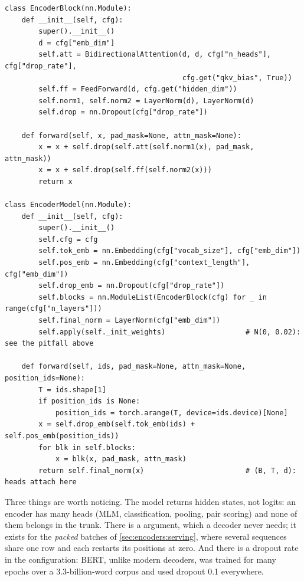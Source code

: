 \begin{lstlisting}[caption={Encoder block and model (from \ident{llmsys/encoder.py}).},label={lst:encoders:model}]
class EncoderBlock(nn.Module):
    def __init__(self, cfg):
        super().__init__()
        d = cfg["emb_dim"]
        self.att = BidirectionalAttention(d, d, cfg["n_heads"], cfg["drop_rate"],
                                          cfg.get("qkv_bias", True))
        self.ff = FeedForward(d, cfg.get("hidden_dim"))
        self.norm1, self.norm2 = LayerNorm(d), LayerNorm(d)
        self.drop = nn.Dropout(cfg["drop_rate"])

    def forward(self, x, pad_mask=None, attn_mask=None):
        x = x + self.drop(self.att(self.norm1(x), pad_mask, attn_mask))
        x = x + self.drop(self.ff(self.norm2(x)))
        return x

class EncoderModel(nn.Module):
    def __init__(self, cfg):
        super().__init__()
        self.cfg = cfg
        self.tok_emb = nn.Embedding(cfg["vocab_size"], cfg["emb_dim"])
        self.pos_emb = nn.Embedding(cfg["context_length"], cfg["emb_dim"])
        self.drop_emb = nn.Dropout(cfg["drop_rate"])
        self.blocks = nn.ModuleList(EncoderBlock(cfg) for _ in range(cfg["n_layers"]))
        self.final_norm = LayerNorm(cfg["emb_dim"])
        self.apply(self._init_weights)                   # N(0, 0.02): see the pitfall above

    def forward(self, ids, pad_mask=None, attn_mask=None, position_ids=None):
        T = ids.shape[1]
        if position_ids is None:
            position_ids = torch.arange(T, device=ids.device)[None]
        x = self.drop_emb(self.tok_emb(ids) + self.pos_emb(position_ids))
        for blk in self.blocks:
            x = blk(x, pad_mask, attn_mask)
        return self.final_norm(x)                        # (B, T, d): heads attach here
\end{lstlisting}

Three things are worth noticing. The model returns hidden states, not logits: an encoder has many
heads (MLM, classification, pooling, pair scoring) and none of them belongs in the trunk. There is a
 argument, which a decoder never needs; it exists for the \emph{packed} batches
of \cref{sec:encoders:serving}, where several sequences share one row and each restarts its positions
at zero. And there is a dropout rate in the configuration: BERT, unlike modern decoders, was trained
for many epochs over a 3.3-billion-word corpus and used dropout 0.1 everywhere.

